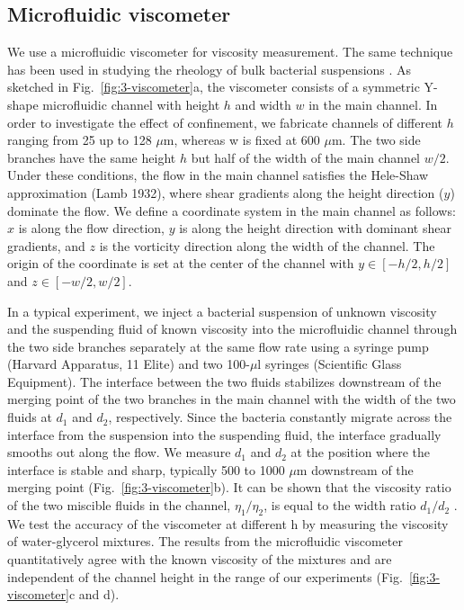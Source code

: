 \subsection{Microfluidic viscometer}
We use a microfluidic viscometer for viscosity measurement. The same technique has been used in studying the rheology of bulk bacterial suspensions \cite{Gachelin2013}. As sketched
in Fig.~\ref{fig:3-viscometer}a, the viscometer consists of a symmetric Y-shape microfluidic channel with height $h$ and width $w$ in the main channel. In order to investigate the effect of confinement, we
fabricate channels of different $h$ ranging from 25 up to 128 $\mu$m, whereas w is fixed at 600 $\mu$m. The two side branches have the same height $h$ but half of the width of the main
channel $w/2$. Under these conditions, the flow in the main channel satisfies the Hele-Shaw approximation (Lamb 1932), where shear gradients along the height direction ($y$) dominate the flow. We define a coordinate system in the main channel as follows: $x$ is along the flow direction, $y$ is along the height direction with dominant shear gradients, and $z$ is the vorticity direction along the width of the channel.
The origin of the coordinate is set at the center of the channel with $y \in [-h/2, h/2]$ and $z \in [-w/2, w/2]$.

In a typical experiment, we inject a bacterial suspension of unknown viscosity and the suspending fluid of known viscosity into the microfluidic channel through the two side branches separately at the same flow rate using a syringe pump (Harvard Apparatus, 11 Elite) and two 100-$\mu$l syringes (Scientific Glass Equipment). The interface between the two fluids stabilizes downstream of the merging point of the two branches in the main channel with the width of the two fluids at $d_1$ and $d_2$, respectively.
Since the bacteria constantly migrate across the interface from the suspension into the suspending fluid, the interface gradually smooths out along the flow. We measure $d_1$ and $d_2$ at the position where the interface is stable and sharp, typically 500 to 1000 $\mu$m downstream of the merging point (Fig.~\ref{fig:3-viscometer}b).
It can be shown that the viscosity ratio of the two miscible fluids in the channel, $\eta_1/\eta_2$, is equal to the width ratio $d_1/d_2$ \cite{Guillot2006, Nghe2010}. We test the accuracy of the viscometer at different h by measuring the viscosity of water-glycerol mixtures.
The results from the microfluidic viscometer quantitatively agree with the known viscosity of the mixtures and are independent of the channel height in the range of our experiments (Fig.~\ref{fig:3-viscometer}c and d).

